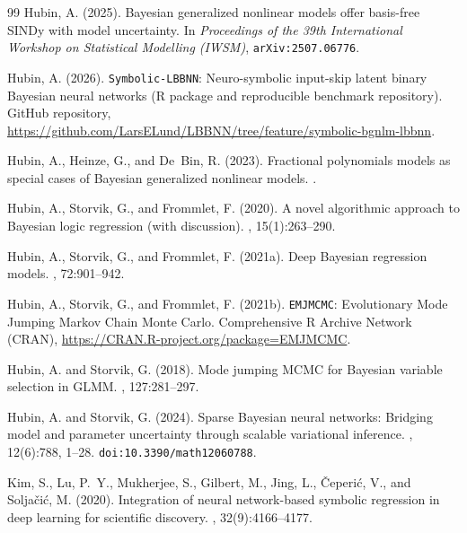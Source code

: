 \documentclass[11pt,a4paper]{article}
\begin{document}
\begin{thebibliography}{99}
Hubin, A. (2025).
\newblock Bayesian generalized nonlinear models offer basis-free {SINDy} with model uncertainty.
\newblock In {\em Proceedings of the 39th International Workshop on Statistical Modelling (IWSM)}, \texttt{arXiv:2507.06776}.

Hubin, A. (2026).
\newblock \texttt{Symbolic-LBBNN}: Neuro-symbolic input-skip latent binary {B}ayesian neural networks ({R} package and reproducible benchmark repository).
\newblock GitHub repository, \url{https://github.com/LarsELund/LBBNN/tree/feature/symbolic-bgnlm-lbbnn}.

Hubin, A., Heinze, G., and De~Bin, R. (2023).
\newblock Fractional polynomials models as special cases of {B}ayesian generalized nonlinear models.
.

Hubin, A., Storvik, G., and Frommlet, F. (2020).
\newblock A novel algorithmic approach to {B}ayesian logic regression (with discussion).
, 15(1):263--290.

Hubin, A., Storvik, G., and Frommlet, F. (2021a).
\newblock Deep {B}ayesian regression models.
, 72:901--942.

Hubin, A., Storvik, G., and Frommlet, F. (2021b).
\newblock \texttt{EMJMCMC}: Evolutionary Mode Jumping {M}arkov Chain {M}onte {C}arlo.
\newblock Comprehensive {R} Archive Network (CRAN), \url{https://CRAN.R-project.org/package=EMJMCMC}.

Hubin, A. and Storvik, G. (2018).
\newblock Mode jumping {MCMC} for {B}ayesian variable selection in {GLMM}.
, 127:281--297.

Hubin, A. and Storvik, G. (2024).
\newblock Sparse {B}ayesian neural networks: Bridging model and parameter uncertainty through scalable variational inference.
, 12(6):788, 1--28.
\newblock \texttt{doi:10.3390/math12060788}.

Kim, S., Lu, P.~Y., Mukherjee, S., Gilbert, M., Jing, L., {\v{C}}eperi{\'c}, V., and Solja{\v{c}}i{\'c}, M. (2020).
\newblock Integration of neural network-based symbolic regression in deep learning for scientific discovery.
, 32(9):4166--4177.


\end{thebibliography}
\end{document}

